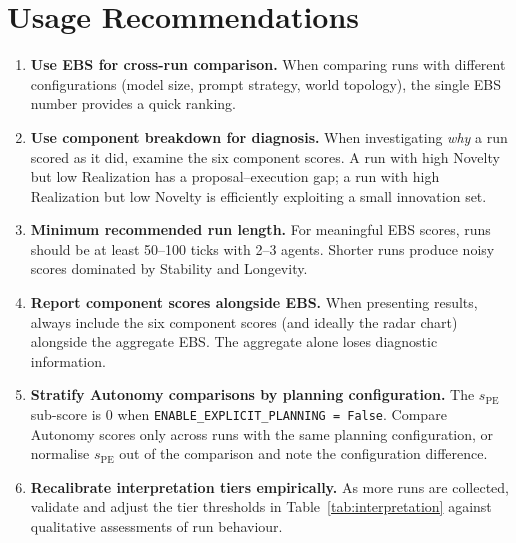 \documentclass[a4paper, 11pt]{article}
\begin{document}
\section{Usage Recommendations}

\begin{enumerate}
    \item \textbf{Use EBS for cross-run comparison.} When comparing runs with different configurations (model size, prompt strategy, world topology), the single EBS number provides a quick ranking.

    \item \textbf{Use component breakdown for diagnosis.} When investigating \emph{why} a run scored as it did, examine the six component scores. A run with high Novelty but low Realization has a proposal--execution gap; a run with high Realization but low Novelty is efficiently exploiting a small innovation set.

    \item \textbf{Minimum recommended run length.} For meaningful EBS scores, runs should be at least 50--100 ticks with 2--3 agents. Shorter runs produce noisy scores dominated by Stability and Longevity.

    \item \textbf{Report component scores alongside EBS.} When presenting results, always include the six component scores (and ideally the radar chart) alongside the aggregate EBS. The aggregate alone loses diagnostic information.

    \item \textbf{Stratify Autonomy comparisons by planning configuration.} The $s_{\text{PE}}$ sub-score is $0$ when \texttt{ENABLE\_EXPLICIT\_PLANNING = False}. Compare Autonomy scores only across runs with the same planning configuration, or normalise $s_{\text{PE}}$ out of the comparison and note the configuration difference.

    \item \textbf{Recalibrate interpretation tiers empirically.} As more runs are collected, validate and adjust the tier thresholds in Table~\ref{tab:interpretation} against qualitative assessments of run behaviour.


\end{enumerate}
\end{document}
